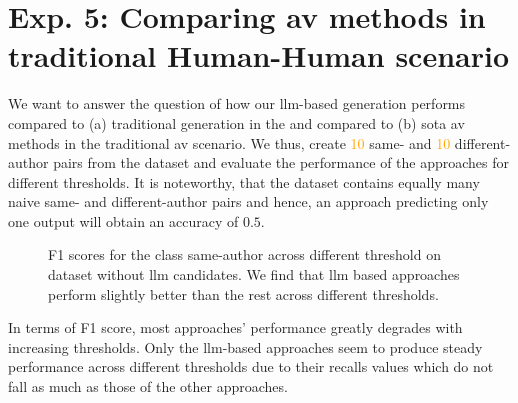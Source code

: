\section{Exp. 5: Comparing \acs{av} methods in traditional Human-Human scenario}
\label{sec:results_trad_av}

We want to answer the question of how our \ac{llm}-based \imp{} generation performs compared to (a) traditional \imp{} generation in the \impAppr{} and compared to (b) \acl{sota} \ac{av} methods in the traditional \ac{av} scenario.
We thus, create \textcolor{orange}{10} same- and \textcolor{orange}{10} different-author pairs from the \dataStudent{} dataset and evaluate the performance of the approaches for different thresholds.
It is noteworthy, that the dataset contains equally many naive same- and different-author pairs and hence, an approach predicting only one output will obtain an accuracy of $0.5$.

%     

\begin{figure}[h]
\centering
    
  \caption{F1 scores for the class same-author across different threshold on \dataStudent{} dataset without \ac{llm} candidates. 
  We find that \ac{llm} based approaches perform slightly better than the rest across different thresholds.
  }
  \label{fig:human-human_f1}
\end{figure}


In terms of F1 score, most approaches' performance greatly degrades with increasing thresholds.
Only the \ac{llm}-based approaches seem to produce steady performance across different thresholds due to their recalls values which do not fall as much as those of the other approaches.


